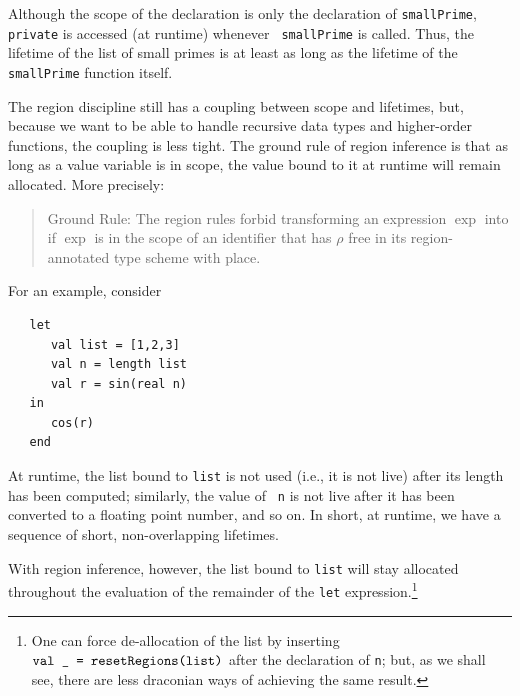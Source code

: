 \documentclass[12pt]{book}
\begin{document}
Although the scope of the declaration is only the declaration of 
%
{\tt smallPrime}, {\tt private} is accessed (at runtime) whenever {\tt
  smallPrime} is called.  Thus, the lifetime of the list of small
primes is at least as long as the lifetime of the {\tt smallPrime}
function itself.

The region discipline still has a coupling between scope and
lifetimes, but, because we want to be able to handle recursive data
types and higher-order functions, the coupling is less tight.  The
ground rule of region inference
%
%
is that as long as a value variable is in scope, the value bound to it
at runtime will remain allocated. More precisely:
\begin{quote}
  Ground Rule: The region rules forbid transforming an expression
  $\exp$ into  if $\exp$ is in
  the scope of an identifier that has $\rho$ free in its
  region-annotated type scheme with place.
\end{quote}
For an example, consider
\begin{verbatim}
   let 
      val list = [1,2,3]
      val n = length list
      val r = sin(real n)
   in
      cos(r)
   end
\end{verbatim} 
At runtime, the list bound to {\tt list} is not used (i.e., it is not
live) after its length has been computed; similarly, the value of {\tt
  n} is not live after it has been converted to a floating point
number, and so on. In short, at runtime, we have a sequence of short,
non-overlapping lifetimes.

With region inference, however, the list bound to {\tt list} will stay
allocated throughout the evaluation of the remainder of the {\tt let}
expression.\footnote{One can force de-allocation of the list by
  inserting $\hbox{\tt val \_ = \hbox{\tt resetRegions}(list)}$ after the declaration of
  {\tt n}; but, as we shall see, there are less draconian ways of
  achieving the same result.}
\end{document}

